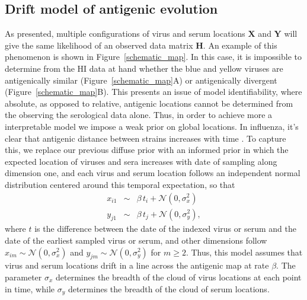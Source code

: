 \documentclass[11pt,oneside,letterpaper]{article}
\newcommand{\viruses}{\mathbf{X}}					%
\newcommand{\sera}{\mathbf{Y}}						%
\newcommand{\virussd}{\sigma_x}						%
\newcommand{\serumsd}{\sigma_y}						%
\newcommand{\normal}{\mathcal{N}}					%
\begin{document}
\subsection*{Drift model of antigenic evolution}

As presented, multiple configurations of virus and serum locations $\viruses$ and $\sera$ will give the same likelihood of an observed data matrix $\mathbf{H}$.
An example of this phenomenon is shown in Figure~\ref{schematic_map}.
In this case, it is impossible to determine from the HI data at hand whether the blue and yellow viruses are antigenically similar (Figure~\ref{schematic_map}A) or antigenically divergent (Figure~\ref{schematic_map}B). 
This presents an issue of model identifiability, where absolute, as opposed to relative, antigenic locations cannot be determined from the observing the serological data alone.
Thus, in order to achieve more a interpretable model we impose a weak prior on global locations.
In influenza, it's clear that antigenic distance between strains increases with time \cite{Smith04,Cai10}.
To capture this, we replace our previous diffuse prior with an informed prior in which the expected location of viruses and sera increases with date of sampling along dimension one, and each virus and serum location follows an independent normal distribution centered around this temporal expectation, so that
\begin{eqnarray}
	x_{i1} &\sim& \beta \, t_i + \normal(0, \virussd^2) \nonumber \\
	y_{j1} &\sim& \beta \, t_j + \normal(0, \serumsd^2),
\end{eqnarray}
where $t$ is the difference between the date of the indexed virus or serum and the date of the earliest sampled virus or serum, and other dimensions follow $x_{im} \sim \normal(0, \virussd^2)$ and $y_{jm} \sim \normal(0, \serumsd^2)$ for $m\ge2$.
Thus, this model assumes that virus and serum locations drift in a line across the antigenic map at rate $\beta$.
The parameter $\virussd$ determines the breadth of the cloud of virus locations at each point in time, while $\serumsd$ determines the breadth of the cloud of serum locations.
\end{document}
